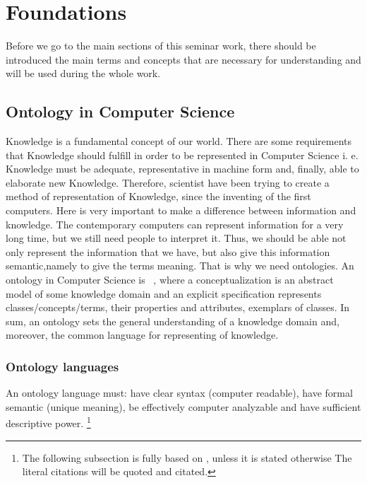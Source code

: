 \section{Foundations}
Before we go to the main sections of this seminar work, there should be introduced the main terms and concepts that are necessary for understanding and will be used during the whole work.

	\subsection{Ontology in Computer Science}
	Knowledge is a fundamental concept of our world. There are some requirements that Knowledge should fulfill in order to be represented in Computer Science i. e. Knowledge must be adequate, representative in machine form and, finally, able to elaborate new Knowledge. Therefore, scientist have been trying to create a method of representation of Knowledge, since the inventing of the first computers. Here is very important to make a difference between information and knowledge. The contemporary computers can represent information for a very long time, but we still need people to interpret it. Thus, we should be able not only represent the information that we have, but also give this information semantic,namely to give the terms meaning. That is why we need ontologies. An ontology in Computer Science is \frqq\cite[p. 1]{Gru93} \ , where a conceptualization is an abstract model of some knowledge domain and an explicit specification represents classes/concepts/terms, their properties and attributes, exemplars of classes. In sum, an ontology sets the general understanding of a knowledge domain and, moreover, the common language for representing of knowledge.     
		\subsubsection{Ontology languages}
		An ontology language must: have clear syntax (computer readable), have formal semantic (unique meaning), be effectively computer analyzable and have sufficient descriptive power. \footnote{The following subsection is fully based on \cite{Kon10}, unless it is stated otherwise  The literal citations will be quoted and citated.}
		
